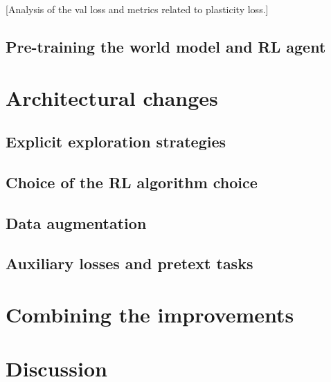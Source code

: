 \documentclass[twoside,11pt]{article}
\begin{document}
  [Analysis of the val loss and metrics related to plasticity loss.]

\subsection{Pre-training the world model and RL agent}

\section{Architectural changes}

\subsection{Explicit exploration strategies}

\subsection{Choice of the RL algorithm choice}

\subsection{Data augmentation}

\subsection{Auxiliary losses and pretext tasks}

\section{Combining the improvements}

\section{Discussion}

\vskip 0.2in

\end{document}
